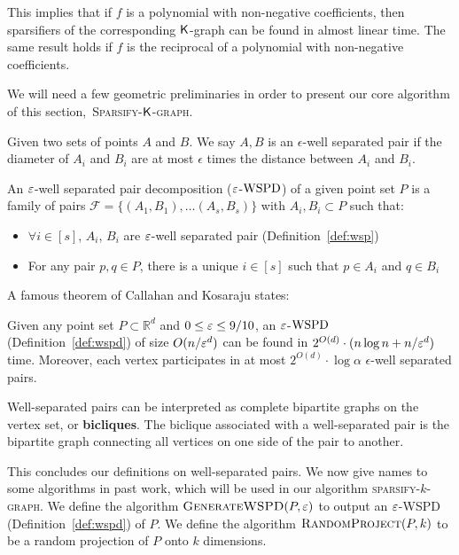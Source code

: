 This implies that if $f$ is a polynomial with non-negative coefficients, then sparsifiers of the corresponding $\mathsf{K}$-graph can be found in almost linear time. The same result holds if $f$ is the reciprocal of a polynomial with non-negative coefficients.


We will need a few geometric preliminaries in order to present our core algorithm of this section,~\textsc{Sparsify-$\mathsf{K}$-graph}.

\begin{definition}\label{def:wsp}
Given two sets of points $A$ and $B$. We say $A,B$ is an $\epsilon$-well separated pair if the diameter of $A_i$ and $B_i$ are at most $\epsilon$ times the distance between $A_i$ and $B_i$.
\end{definition}

\begin{definition}\label{def:wspd}
An $\varepsilon$-well separated pair decomposition ($\varepsilon$-$\mathrm{WSPD}$) of a given point set $P$ is a family of pairs $\mathcal{F} = \{(A_1, B_1), \ldots (A_s, B_s)\}$ with $A_i, B_i \subset P$ such that:
\begin{itemize}
    \item $\forall i \in [s]$, $A_i$, $B_i$ are $\varepsilon$-well separated pair (Definition~\ref{def:wsp}) 
    \item For any pair $p, q \in P$, there is a unique $i \in [s]$ such that $p \in A_i$ and $q \in B_i$
\end{itemize}
\end{definition}
A famous theorem of Callahan and Kosaraju \cite{ck95} states:
\begin{theorem}\label{thm:wspd}
Given any point set $P \subset \mathbb{R}^d$ and $0 \leq \varepsilon \leq 9/10$, an $\varepsilon$-$\mathrm{WSPD}$ (Definition~\ref{def:wspd}) of size $O(n /\varepsilon^d)$ can be found in $2^{O(d)} \cdot ( n \log n + n / \varepsilon^d ) $ time. Moreover, each vertex participates in at most $2^{O(d)} \cdot \log \alpha$ $\epsilon$-well separated pairs.
\end{theorem}
Well-separated pairs can be interpreted as complete bipartite graphs on the vertex set, or \textbf{bicliques}. The biclique associated with a well-separated pair is the bipartite graph connecting all vertices on one side of the pair to another. 

This concludes our definitions on well-separated pairs. We now give names to some algorithms in past work, which will be used in our algorithm \textsc{sparsify-$k$-graph}. We define the algorithm $\textsc{GenerateWSPD}(P, \varepsilon)$ to output an $\varepsilon$-WSPD (Definition~\ref{def:wspd}) of $P$. We define the algorithm $\textsc{RandomProject}(P, k)$ to be a random projection of $P$ onto $k$ dimensions. 

